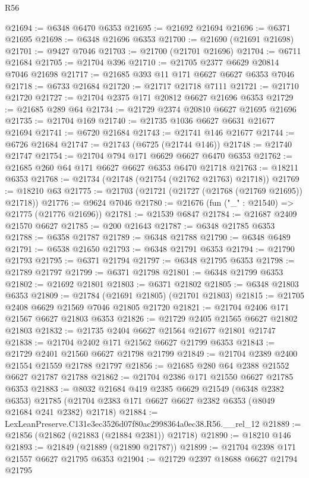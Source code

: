 \begin{lexlean}{R56}
\begin{coremodule}
@21694 := @6348 @6470 @6353
@21695 := @21692 @21694
@21696 := @6371 @21695
@21698 := @6348 @21696 @6353
@21700 := @21690 (@21691 @21698)
@21701 := @9427 @7046
@21703 := @21700 (@21701 @21696)
@21704 := @6711 @21684
@21705 := @21704 @396
@21710 := @21705 @2377 @6629 @20814 @7046 @21698
@21717 := @21685 @393 @11 @171 @6627 @6627 @6353 @7046
@21718 := @6733 @21684
@21720 := @21717 @21718 @7111
@21721 := @21710 @21720
@21727 := @21704 @2375 @171 @20812 @6627 @21696 @6353
@21729 := @21685 @289 @64
@21734 := @21729 @2374 @20810 @6627 @21695 @21696
@21735 := @21704 @169
@21740 := @21735 @1036 @6627 @6631 @21677 @21694
@21741 := @6720 @21684
@21743 := @21741 @146 @21677
@21744 := @6726 @21684
@21747 := @21743 (@6725 (@21744 @146))
@21748 := @21740 @21747
@21754 := @21704 @794 @171 @6629 @6627 @6470 @6353
@21762 := @21685 @260 @64 @171 @6627 @6627 @6353 @6470 @21718
@21763 := @18211 @6353
@21768 := @21734 (@21748 (@21754 (@21762 @21763) @21718))
@21769 := @18210 @63
@21775 := @21703 (@21721 (@21727 (@21768 (@21769 @21695)) @21718))
@21776 := @9624 @7046
@21780 := @21676 (fun ("_" : @21540) => @21775 (@21776 @21696))
@21781 := @21539 @6847
@21784 := @21687 @2409 @21570 @6627
@21785 := @200 @21643
@21787 := @6348 @21785 @6353
@21788 := @6358 @21787
@21789 := @6348 @21788
@21790 := @6348 @6489
@21791 := @6538 @21650
@21793 := @6348 @21791 @6353
@21794 := @21790 @21793
@21795 := @6371 @21794
@21797 := @6348 @21795 @6353
@21798 := @21789 @21797
@21799 := @6371 @21798
@21801 := @6348 @21799 @6353
@21802 := @21692 @21801
@21803 := @6371 @21802
@21805 := @6348 @21803 @6353
@21809 := @21784 (@21691 @21805) (@21701 @21803)
@21815 := @21705 @2408 @6629 @21569 @7046 @21805 @21720
@21821 := @21704 @2406 @171 @21567 @6627 @21803 @6353
@21826 := @21729 @2405 @21565 @6627 @21802 @21803
@21832 := @21735 @2404 @6627 @21564 @21677 @21801 @21747
@21838 := @21704 @2402 @171 @21562 @6627 @21799 @6353
@21843 := @21729 @2401 @21560 @6627 @21798 @21799
@21849 := @21704 @2389 @2400 @21554 @21559 @21788 @21797
@21856 := @21685 @280 @64 @2388 @21552 @6627 @21787 @21788
@21862 := @21704 @2386 @171 @21550 @6627 @21785 @6353
@21883 := @8032
    @21684
    @419
    @2385
    @6629
    @21549
    (@6348 @2382 @6353)
    @21785
    (@21704 @2383 @171 @6627 @6627 @2382 @6353 (@8049 @21684 @241 @2382) @21718)
@21884 := LexLeanPreserve.C131e3ec3526d07f80ac2998364a0ec38.R56.__rel_12
@21889 := @21856 (@21862 (@21883 (@21884 @2381)) @21718)
@21890 := @18210 @146
@21893 := @21849 (@21889 (@21890 @21787))
@21899 := @21704 @2398 @171 @21557 @6627 @21795 @6353
@21904 := @21729 @2397 @18688 @6627 @21794 @21795

\end{coremodule}
\end{lexlean}
